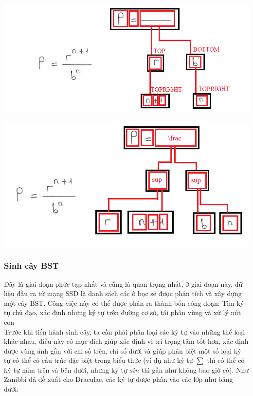 \documentclass[a4paper,12pt]{article}
\begin{document}
	\begin{center}
		\centering
		\includegraphics[width=0.95\linewidth]{BST.png}
		\vspace{0.5cm}
	\end{center}	
	
	\begin{center}
		\centering
		\includegraphics[width=0.85\linewidth]{lexBST.png}
		\vspace{0.5cm}
	\end{center}
	
	\subsubsection{Sinh cây BST\cite{zanibbi}}
	
	Đây là giai đoạn phức tạp nhất và cũng là quan trọng nhất, ở giai đoạn này, dữ liệu đầu ra từ mạng SSD\cite{liu2016ssd} là danh sách các ô bọc sẽ được phân tích và xây dựng một cây BST\cite{zanibbi}. Công việc này có thể được phân ra thành bốn công đoạn: Tìm ký tự chủ đạo, xác định những ký tự trên đường cơ sở, tái phân vùng và xử lý nút con\\
	
	Trước khi tiến hành sinh cây, ta cần phải phân loại các ký tự vào những thể loại khác nhau, điều này có mục đích giúp xác định vị trí trọng tâm tốt hơn, xác định được vùng ảnh gắn với chỉ số trên, chỉ số dưới và giúp phân biệt một số loại ký tự có thể có cấu trức đặc biệt trong biểu thức (ví dụ như ký tự $\sum$ thì có thể có ký tự nằm trên và bên dưới, nhưng ký tự $sin$ thì gần như không bao giờ có). Như Zanibbi đã đề xuất cho Draculae\cite{zanibbi}, các ký tự được phân vào các lớp như bảng dưới:
	
\end{document}
